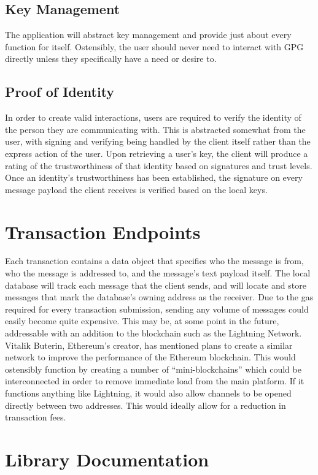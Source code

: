 \documentclass[]{article}
\begin{document}
\subsection{Key Management}
The application will abstract key management and provide just about every function for itself. Ostensibly, the user should never need to interact with GPG directly unless they specifically have a need or desire to.
\subsection{Proof of Identity}
In order to create valid interactions, users are required to verify the identity of the person they are communicating with. This is abstracted somewhat from the user, with signing and verifying being handled by the client itself rather than the express action of the user. Upon retrieving a user's key, the client will produce a rating of the trustworthiness of that identity based on signatures and trust levels. Once an identity's trustworthiness has been established, the signature on every message payload the client receives is verified based on the local keys.

\section{Transaction Endpoints}
Each transaction contains a data object that specifies who the message is from, who the message is addressed to, and the message's text payload itself. The local database will track each message that the client sends, and will locate and store messages that mark the database's owning address as the receiver. Due to the gas required for every transaction submission, sending any volume of messages could easily become quite expensive. This may be, at some point in the future, addressable with an addition to the blockchain such as the Lightning Network. Vitalik Buterin, Ethereum's creator, has mentioned plans to create a similar network to improve the performance of the Ethereum blockchain. This would ostensibly function by creating a number of ``mini-blockchains'' which could be interconnected in order to remove immediate load from the main platform. If it functions anything like Lightning, it would also allow channels to be opened directly between two addresses. This would ideally allow for a reduction in transaction fees.

\section{Library Documentation}
\end{document}
